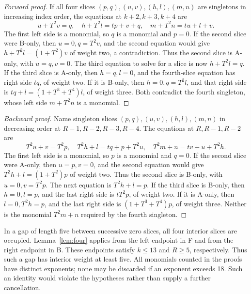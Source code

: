 \documentclass{article}
\begin{document}
\begin{proof}[Forward proof]
  If all four slices \((p,q), (u,v), (h,l), (m,n)\) are singletons in increasing index order, the
  equations at \(k + 2, k + 3, k + 4\) are
  \begin{equation}
    u + T^2 v = q, \quad h + T^2 l = tp + v + q, \quad m + T^2 n = tu + l + v.
  \end{equation}
  The first left side is a monomial, so \(q\) is a monomial and \(p = 0\). If the second slice
  were B-only, then \(u = 0, q = T^2 v\), and the second equation would give
  \(h + T^2 l = (1 + T^2)v\) of weight two, a contradiction. Thus the second slice is A-only, with
  \(u = q, v = 0\). The third equation to solve for a slice is now \(h + T^2 l = q\). If the third
  slice is A-only, then \(h = q, l = 0\), and the fourth-slice equation has right side \(tq\), of
  weight two. If it is B-only, then \(h = 0, q = T^2 l\), and that right side is
  \(tq + l = (1 + T^3 + T^4)l\), of weight three. Both contradict the fourth singleton, whose left
  side \(m + T^2 n\) is a monomial.
\end{proof}

\begin{proof}[Backward proof]
  Name singleton slices \((p,q), (u,v), (h,l), (m,n)\) in decreasing order at
  \(R - 1, R - 2, R - 3, R - 4\). The equations at \(R, R - 1, R - 2\) are
  \begin{equation}
    T^2 u + v = T^2 p, \quad T^2 h + l = tq + p + T^2 u, \quad T^2 m + n = tv + u + T^2 h.
  \end{equation}
  The first left side is a monomial, so \(p\) is a monomial and \(q = 0\). If the second slice
  were A-only, then \(u = p, v = 0\), and the second equation would give
  \(T^2 h + l = (1 + T^2)p\) of weight two. Thus the second slice is B-only, with
  \(u = 0, v = T^2 p\). The next equation is \(T^2 h + l = p\). If the third slice is B-only, then
  \(h = 0, l = p\), and the last right side is \(t T^2 p\), of weight two. If it is A-only, then
  \(l = 0, T^2 h = p\), and the last right side is \((1 + T^3 + T^4)p\), of weight three. Neither
  is the monomial \(T^2 m + n\) required by the fourth singleton.
\end{proof}

In a gap of length five between successive zero slices, all four interior slices are occupied.
Lemma~\ref{lem:four} applies from the left endpoint in F and from the right endpoint in B. These
endpoints satisfy \(k \le 13\) and \(R \ge 5\), respectively. Thus such a gap has interior weight
at least five. All monomials counted in the proofs have distinct exponents; none may be discarded
if an exponent exceeds 18. Such an identity would violate the hypotheses rather than supply a
further cancellation.
\end{document}
